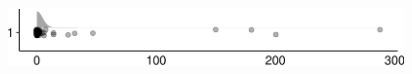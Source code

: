 \documentclass[
]{article}
\begin{document}
\begin{minipage}[t]{0.3\linewidth}

~

\end{minipage}%
\begin{minipage}[t]{0.7\linewidth}

\includegraphics[width=396px]{codebook_template_files/figure-latex/q7_32_rainplot-1}

\end{minipage}
 \vspace*{-5mm} 

\begin{minipage}[t]{0.3\linewidth}

~

\end{minipage}%
\begin{minipage}[t]{0.7\linewidth}

~

\end{minipage}
 \vspace*{-7mm} 
\end{document}
